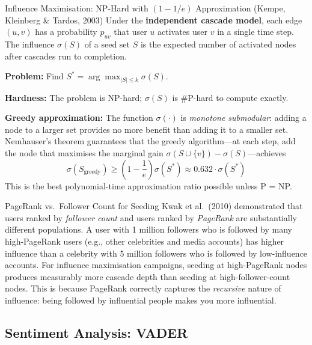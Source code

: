\begin{defbox}{Influence Maximisation: NP-Hard with
  $(1 - 1/e)$ Approximation (Kempe, Kleinberg \& Tardos, 2003)}
Under the \textbf{independent cascade model}, each edge $(u, v)$ has
a probability $p_{uv}$ that user $u$ activates user $v$ in a single time
step. The influence $\sigma(S)$ of a seed set $S$ is the expected
number of activated nodes after cascades run to completion.

\textbf{Problem:} Find $S^* = \arg\max_{|S| \leq k} \sigma(S)$.

\textbf{Hardness:} The problem is NP-hard; $\sigma(S)$ is
\#P-hard to compute exactly.

\textbf{Greedy approximation:} The function $\sigma(\cdot)$ is
\emph{monotone submodular}: adding a node to a larger set provides no
more benefit than adding it to a smaller set. Nemhauser's theorem
guarantees that the greedy algorithm---at each step, add the node that
maximises the marginal gain $\sigma(S \cup \{v\}) - \sigma(S)$---achieves
\[
  \sigma(S_{\text{greedy}}) \geq \left(1 - \frac{1}{e}\right) \sigma(S^*)
  \approx 0.632 \cdot \sigma(S^*)
\]
This is the best polynomial-time approximation ratio possible unless
P = NP.
\end{defbox}

\begin{keyinsight}{PageRank vs.\ Follower Count for Seeding}
Kwak et al.\ (2010) demonstrated that users ranked by \emph{follower count}
and users ranked by \emph{PageRank} are substantially different populations.
A user with 1 million followers who is followed by many high-PageRank users
(e.g., other celebrities and media accounts) has higher influence than a
celebrity with 5 million followers who is followed by low-influence accounts.
For influence maximisation campaigns, seeding at high-PageRank nodes
produces measurably more cascade depth than seeding at high-follower-count
nodes. This is because PageRank correctly captures the \emph{recursive}
nature of influence: being followed by influential people makes you more
influential.
\end{keyinsight}

\subsection{Sentiment Analysis: VADER}
\label{subsec:sentiment}

